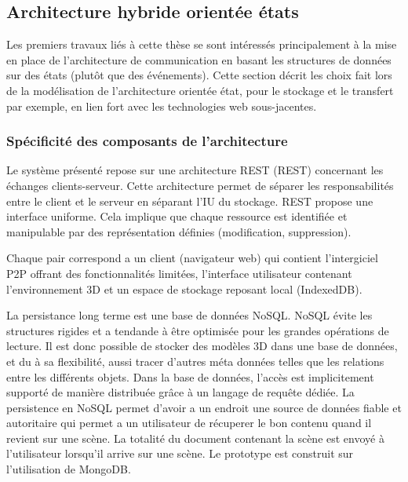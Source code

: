 \subsection{Architecture hybride \og orientée états\fg{}}
\label{sec:comm_state}

Les premiers travaux liés à cette thèse \cite{Desprat2015a,Desprat2015b} se sont 
intéressés principalement à la mise en place de l'architecture de communication 
en basant les structures de données sur des états (plutôt que des événements). 
Cette section décrit les choix fait lors de la modélisation de l'architecture \og 
orientée état\fg{}, pour le stockage et le transfert par exemple, en lien fort avec les 
technologies web sous-jacentes.  
%
%
%
%
%  
\subsubsection{Spécificité des composants de l'architecture}
Le système présenté repose sur une architecture \acrshort{REST} 
(\acrlong{REST}) concernant les échanges clients-serveur. Cette architecture 
permet de séparer les responsabilités entre le client et le serveur en séparant 
l'\gls{IU} du stockage. \gls{REST} propose une interface uniforme. Cela implique 
que chaque ressource est identifiée et manipulable par des représentation définies 
(modification, suppression). 

Chaque pair correspond a un client (navigateur web) qui contient l'intergiciel 
\gls{P2P} offrant des fonctionnalités limitées, l'interface utilisateur contenant 
l'environnement 3D et un espace de stockage reposant local (IndexedDB).

La persistance long terme est une base de données NoSQL.
NoSQL évite les structures rigides et a tendande à être optimisée pour les grandes 
opérations de lecture. Il est donc possible de stocker des modèles 3D dans une 
base de données, et du à sa flexibilité, aussi tracer d'autres méta données telles 
que les relations entre les différents objets. Dans la base de données, l'accès est 
implicitement supporté de manière distribuée grâce à un langage de requête 
dédiée. La persistence en NoSQL permet d'avoir a un endroit une source de 
données fiable et autoritaire qui permet a un utilisateur de récuperer le bon contenu 
quand il revient sur une scène. La totalité du document contenant la scène est 
envoyé à l'utilisateur lorsqu'il arrive sur une scène.
Le prototype est construit sur l'utilisation de MongoDB.



